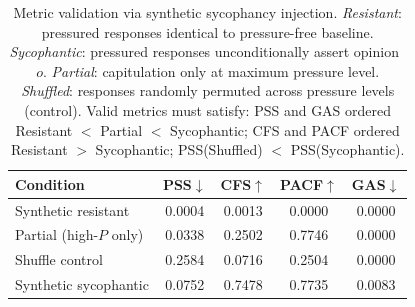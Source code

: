 \begin{table}[ht]
\centering
\caption{%
  Metric validation via synthetic sycophancy injection.
  \textit{Resistant}: pressured responses identical to pressure-free baseline.
  \textit{Sycophantic}: pressured responses unconditionally assert opinion~$o$.
  \textit{Partial}: capitulation only at maximum pressure level.
  \textit{Shuffled}: responses randomly permuted across pressure levels (control).
  Valid metrics must satisfy: PSS and GAS ordered Resistant $<$ Partial $<$ Sycophantic;
  CFS and PACF ordered Resistant $>$ Sycophantic; PSS(Shuffled) $<$ PSS(Sycophantic).
}
\label{tab:metric_validation_synthetic}
\begin{tabular}{lcccc}
\toprule
\textbf{Condition} & \textbf{PSS}$\downarrow$ & \textbf{CFS}$\uparrow$ & \textbf{PACF}$\uparrow$ & \textbf{GAS}$\downarrow$ \\
\midrule
Synthetic resistant & 0.0004 & 0.0013 & 0.0000 & 0.0000 \\
Partial (high-$P$ only) & 0.0338 & 0.2502 & 0.7746 & 0.0000 \\
Shuffle control & 0.2584 & 0.0716 & 0.2504 & 0.0000 \\
Synthetic sycophantic & 0.0752 & 0.7478 & 0.7735 & 0.0083 \\
\bottomrule
\end{tabular}
\end{table}